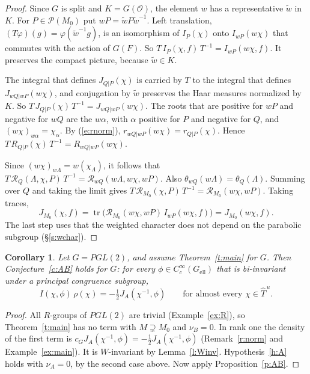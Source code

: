 \documentclass[12pt,letterpaper]{article}
\numberwithin{equation}{section}
\theoremstyle{plain}
\newtheorem{corollary}[theorem]{Corollary}
\theoremstyle{definition}
\theoremstyle{remark}
\newcommand{\OO}{\mathcal{O}}
\newcommand{\cP}{\mathcal{P}}
\newcommand{\Thu}{\widehat{T}^{\,u}}
\DeclareMathOperator{\tr}{tr}
\newcommand{\ellr}{\mathrm{ell}}
\begin{document}
\begin{proof}
Since $G$ is split and $K=G(\OO)$, the element $w$ has a representative $\tilde w$ in $K$. For $P\in\cP(M_0)$ put $wP=\tilde wP\tilde w^{-1}$. Left translation, $(T\varphi)(g)=\varphi(\tilde w^{-1}g)$, is an isomorphism of $I_P(\chi)$ onto $I_{wP}(w\chi)$ that commutes with the action of $G(F)$. So $T\,I_P(\chi,f)\,T^{-1}=I_{wP}(w\chi,f)$. It preserves the compact picture, because $\tilde w\in K$.

The integral that defines $J_{Q|P}(\chi)$ is carried by $T$ to the integral that defines $J_{wQ|wP}(w\chi)$, and conjugation by $\tilde w$ preserves the Haar measures normalized by $K$. So $T\,J_{Q|P}(\chi)\,T^{-1}=J_{wQ|wP}(w\chi)$. The roots that are positive for $wP$ and negative for $wQ$ are the $w\alpha$, with $\alpha$ positive for $P$ and negative for $Q$, and $(w\chi)_{w\alpha}=\chi_\alpha$. By (\ref{e:rnorm}), $r_{wQ|wP}(w\chi)=r_{Q|P}(\chi)$. Hence $T\,R_{Q|P}(\chi)\,T^{-1}=R_{wQ|wP}(w\chi)$.

Since $(w\chi)_{w\Lambda}=w(\chi_\Lambda)$, it follows that $T\,\mathcal R_Q(\Lambda,\chi,P)\,T^{-1}=\mathcal R_{wQ}(w\Lambda,w\chi,wP)$. Also $\theta_{wQ}(w\Lambda)=\theta_Q(\Lambda)$. Summing over $Q$ and taking the limit gives $T\,\mathcal R_{M_0}(\chi,P)\,T^{-1}=\mathcal R_{M_0}(w\chi,wP)$. Taking traces,
\[
J_{M_0}(\chi,f)=\tr\big(\mathcal R_{M_0}(w\chi,wP)\,I_{wP}(w\chi,f)\big)=J_{M_0}(w\chi,f).
\]
The last step uses that the weighted character does not depend on the parabolic subgroup (\S\ref{s:wchar}).
\end{proof}

\begin{corollary}\label{c:pgl2}
Let $G=PGL(2)$, and assume Theorem~\ref{t:main} for $G$. Then Conjecture~\ref{c:AB} holds for $G$: for every $\phi\in C_c^\infty(G_{\ellr})$ that is bi-invariant under a principal congruence subgroup,
\[
I(\chi,\phi)\,\rho(\chi)=-\tfrac12J_A(\chi^{-1},\phi)\qquad\text{for almost every }\chi\in\Thu .
\]
\end{corollary}

\begin{proof}
All $R$-groups of $PGL(2)$ are trivial (Example~\ref{ex:R}), so Theorem~\ref{t:main} has no term with $M\supsetneq M_0$ and $\nu_B=0$. In rank one the density of the first term is $c_GJ_A(\chi^{-1},\phi)=-\frac12J_A(\chi^{-1},\phi)$ (Remark~\ref{r:norm} and Example~\ref{ex:main}). It is $W$-invariant by Lemma~\ref{l:Winv}. Hypothesis~\ref{h:A} holds with $\nu_A=0$, by the second case above. Now apply Proposition~\ref{p:AB}.
\end{proof}
\end{document}
